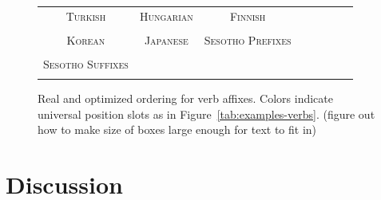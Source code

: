 \documentclass[11pt,letterpaper]{article}
\newcommand\mhahn[1]{{\color{red}(#1)}}
\begin{document}
\begin{figure}[]

\begin{tabular}{cccccccc}
\textsc{Turkish} & \textsc{Hungarian} & \textsc{Finnish} \\
\begin{minipage}{.3\textwidth}
  
  \end{minipage}
  &
  \begin{minipage}{.3\textwidth}
  
  \end{minipage}
  &
    \begin{minipage}{.3\textwidth}
  
  \end{minipage}
  \\
  \textsc{Korean}  & \textsc{Japanese} & \textsc{Sesotho Prefixes} \\
      \begin{minipage}{.3\textwidth}
  
  \end{minipage}
  &
  \begin{minipage}{.3\textwidth}
  
  \end{minipage}
  &
  \begin{minipage}{.3\textwidth}
  
  \end{minipage} \\
  \textsc{Sesotho Suffixes} \\
  \begin{minipage}{.3\textwidth}
  
  \end{minipage}
  \end{tabular}
  
  
    \caption{Real and optimized ordering for verb affixes. Colors indicate universal position slots as in Figure~\ref{tab:examples-verbs}.
    \mhahn{figure out how to make size of boxes large enough for text to fit in}%
    }
    \label{fig:real_and_optimized_verbs}
\end{figure}




\section{Discussion}
\end{document}
